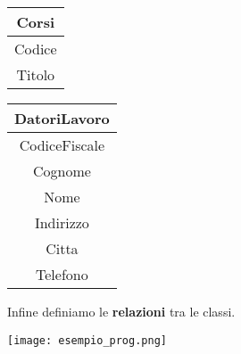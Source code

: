 \begin{example}
\begin{center}
\begin{tabular}{|c|}
			\hline
			\textbf{Corsi} \\
			\hline
			Codice \\
			\hline
			Titolo\\
			\hline
		\end{tabular}
		\hspace{15pt}
		\begin{tabular}{|c|}
			\hline
			\textbf{DatoriLavoro} \\
			\hline
			CodiceFiscale\\
			\hline
			Cognome \\
			\hline
			Nome \\
			\hline
			Indirizzo \\
			\hline
			Citta \\
			\hline
			Telefono \\
			\hline
		\end{tabular}
	\end{center}
	Infine definiamo le \textbf{relazioni} tra le classi.
	\begin{center}
		\texttt{[image: esempio\_prog.png]}
	\end{center}
\end{example}